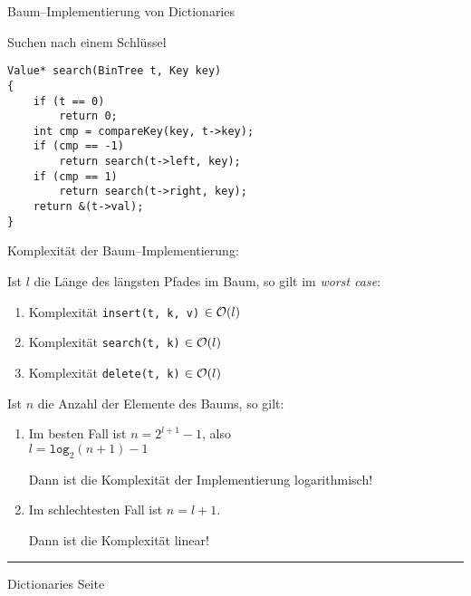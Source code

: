 \begin{slide}{}
\normalsize

\begin{center}
Baum--Implementierung von Dictionaries
\end{center}
\vspace*{0.5cm}

\footnotesize
Suchen nach einem Schl\"ussel
\begin{verbatim}
Value* search(BinTree t, Key key) 
{
    if (t == 0)
        return 0;
    int cmp = compareKey(key, t->key);
    if (cmp == -1)
        return search(t->left, key);
    if (cmp == 1)
        return search(t->right, key);
    return &(t->val);
}
\end{verbatim}

Komplexit\"at der Baum--Implementierung: 

Ist $l$ die L\"ange des l\"angsten Pfades im Baum, so gilt im \emph{worst case}:
\begin{enumerate}
\item Komplexit\"at \texttt{insert(t, k, v)} $\in \mathcal{O}(l)$
\item Komplexit\"at \texttt{search(t, k)} $\in \mathcal{O}(l)$
\item Komplexit\"at \texttt{delete(t, k)} $\in \mathcal{O}(l)$
\end{enumerate}

Ist $n$ die Anzahl der Elemente des Baums, so gilt:
\begin{enumerate}
\item Im besten Fall ist $n = 2^{l+1} - 1$, also \\[0.3cm]
      \hspace*{1.3cm} $l = \mathtt{log}_2(n+1) - 1$

      Dann ist die Komplexit\"at der Implementierung logarithmisch!
\item Im schlechtesten Fall ist $n = l + 1$.

      Dann ist die Komplexit\"at linear!
\end{enumerate}

\vspace*{\fill}
\tiny \addtocounter{mypage}{1}
\rule{17cm}{1mm}
Dictionaries  \hspace*{\fill} Seite 
\end{slide}


